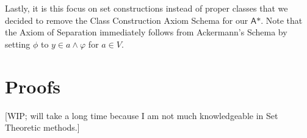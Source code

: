 \documentclass{article}
\begin{document}
Lastly, it is this focus on set constructions instead of proper classes that we decided to remove the Class Construction Axiom Schema for our $\textsf{A*}$. Note that the Axiom of Separation immediately follows from Ackermann's Schema by setting $\phi$ to $y \in a \wedge \varphi$ for $a\in V$.




\appendix

\section{Proofs}\label{proofs}
[WIP; will take a long time because I am not much knowledgeable in Set Theoretic methods.]
\end{document}
